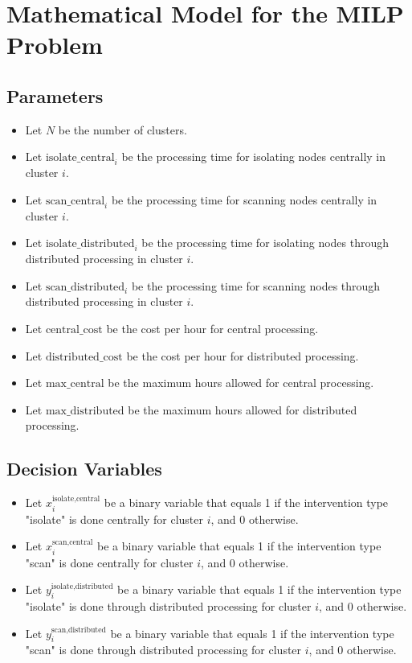 \documentclass{article}
\begin{document}
\section*{Mathematical Model for the MILP Problem}

\subsection*{Parameters}
\begin{itemize}
    \item Let \( N \) be the number of clusters.
    \item Let \( \text{isolate\_central}_{i} \) be the processing time for isolating nodes centrally in cluster \( i \).
    \item Let \( \text{scan\_central}_{i} \) be the processing time for scanning nodes centrally in cluster \( i \).
    \item Let \( \text{isolate\_distributed}_{i} \) be the processing time for isolating nodes through distributed processing in cluster \( i \).
    \item Let \( \text{scan\_distributed}_{i} \) be the processing time for scanning nodes through distributed processing in cluster \( i \).
    \item Let \( \text{central\_cost} \) be the cost per hour for central processing.
    \item Let \( \text{distributed\_cost} \) be the cost per hour for distributed processing.
    \item Let \( \text{max\_central} \) be the maximum hours allowed for central processing.
    \item Let \( \text{max\_distributed} \) be the maximum hours allowed for distributed processing.
\end{itemize}

\subsection*{Decision Variables}
\begin{itemize}
    \item Let \( x_{i}^{\text{isolate,central}} \) be a binary variable that equals 1 if the intervention type "isolate" is done centrally for cluster \( i \), and 0 otherwise.
    \item Let \( x_{i}^{\text{scan,central}} \) be a binary variable that equals 1 if the intervention type "scan" is done centrally for cluster \( i \), and 0 otherwise.
    \item Let \( y_{i}^{\text{isolate,distributed}} \) be a binary variable that equals 1 if the intervention type "isolate" is done through distributed processing for cluster \( i \), and 0 otherwise.
    \item Let \( y_{i}^{\text{scan,distributed}} \) be a binary variable that equals 1 if the intervention type "scan" is done through distributed processing for cluster \( i \), and 0 otherwise.
\end{itemize}
\end{document}
